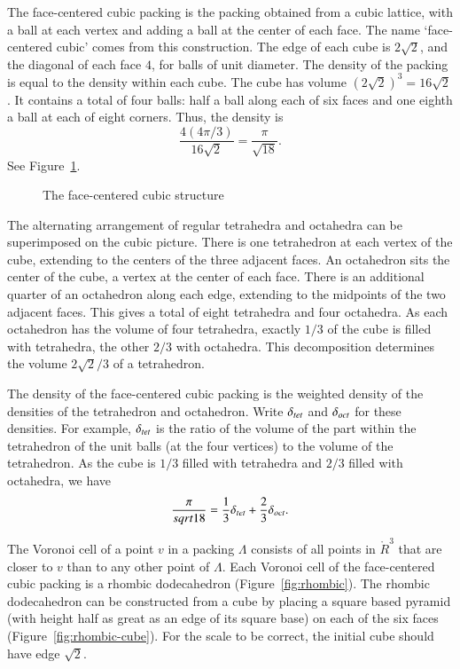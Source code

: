 The face-centered cubic packing is the packing obtained
from a cubic lattice, with a ball at each vertex and adding
a ball at the center of each face.  The name `face-centered cubic' comes from this construction.  The edge of each cube is
$2\sqrt2$, and the diagonal of each face $4$, for balls
of unit diameter.  The density of the packing is equal to the density
within each cube.  The cube has volume $(2\sqrt2)^3 = 16\sqrt2$.
It contains a total of four balls:  half a ball along each
of six faces and one eighth a ball at each of eight corners.
Thus, the density is
   $$
   \frac{   4 (4\pi/3)}{16\sqrt2} = \frac{\pi}{\sqrt{18}}.
   $$
See Figure~\ref{fig:fcc-cube}.

\begin{figure}[htb]
  \centering
  \caption{The face-centered cubic structure}
  \label{fig:fcc-cube}
\end{figure}


The alternating arrangement of regular tetrahedra and octahedra can be
superimposed on the cubic picture.  There is one tetrahedron at each vertex
of the cube, extending to the centers of the three adjacent faces.
An octahedron sits the center of the cube, a vertex
at the center of each face.  There is an additional quarter of an
octahedron along each edge, extending to the midpoints of the two adjacent
faces.  This gives a total of eight tetrahedra and four octahedra.  
As each
octahedron has the volume of four tetrahedra, exactly $1/3$ of
the cube is filled with tetrahedra, the other $2/3$ with octahedra.
This decomposition determines the volume $2\sqrt2/3$ of a tetrahedron.

The density of the face-centered cubic packing is the weighted density
of the densities of the tetrahedron and octahedron.  Write $\delta_{tet}$
and $\delta_{oct}$ for these densities.  For example, $\delta_{tet}$ is the ratio
of the volume
of the part within the tetrahedron of the unit balls (at the four vertices)
to the volume of the tetrahedron.  As the cube is $1/3$ filled  with
tetrahedra and $2/3$ filled with octahedra, we have
$$
  \frac{\pi}{sqrt{18}} = \frac{1}{3}\delta_{tet} + \frac{2}{3}\delta_{oct}.
$$

The Voronoi cell of a point $v$ 
in a packing $\Lambda$ consists of
all points in $\ring{R}^3$ that are closer to $v$ than to any
other point of $\Lambda$.
Each Voronoi cell of the face-centered cubic
packing is a rhombic dodecahedron (Figure~\ref{fig:rhombic}).   %
The rhombic dodecahedron can be constructed from a cube by placing a
square based pyramid (with height half as great as an edge of its square
base) on each of the six faces (Figure~\ref{fig:rhombic-cube}).  %
For the scale to be correct, the
initial cube should have edge $\sqrt{2}$. 

